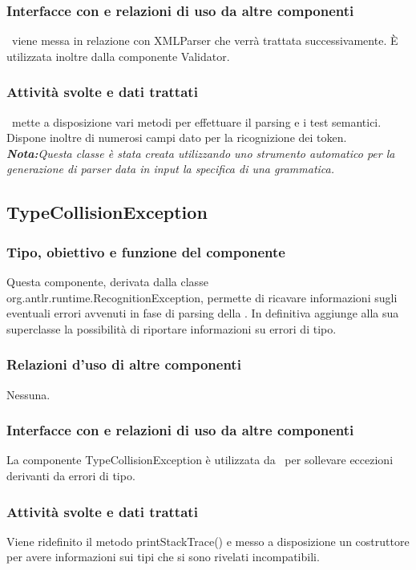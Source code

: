 \subsubsection{Interfacce con e relazioni di uso da altre componenti}
\brp\ viene messa in relazione con XMLParser che verr\`a trattata successivamente.
\`E utilizzata inoltre dalla componente Validator.
\subsubsection{Attivit\`a svolte e dati trattati}
\brp\ mette a disposizione vari metodi per effettuare il parsing e i test semantici. Dispone inoltre di numerosi campi dato per la ricognizione dei token.\\
\textit{\textbf{Nota:}Questa classe \`e stata creata utilizzando uno strumento automatico per la generazione di parser data in input la specifica di una grammatica.}

\subsection{TypeCollisionException}
\subsubsection{Tipo, obiettivo e funzione del componente}
Questa componente, derivata dalla classe\\ org.antlr.runtime.RecognitionException, permette di ricavare informazioni sugli eventuali errori avvenuti in fase di parsing della \br. In definitiva aggiunge alla sua superclasse la possibilit\`a di riportare informazioni su errori di tipo.
\subsubsection{Relazioni d'uso di altre componenti}
Nessuna.
\subsubsection{Interfacce con e relazioni di uso da altre componenti}
La componente TypeCollisionException \`e utilizzata da \brp\ per sollevare eccezioni derivanti da errori di tipo.
\subsubsection{Attivit\`a svolte e dati trattati}
Viene ridefinito il metodo printStackTrace() e messo a disposizione un costruttore per avere informazioni sui tipi che si sono rivelati incompatibili.

